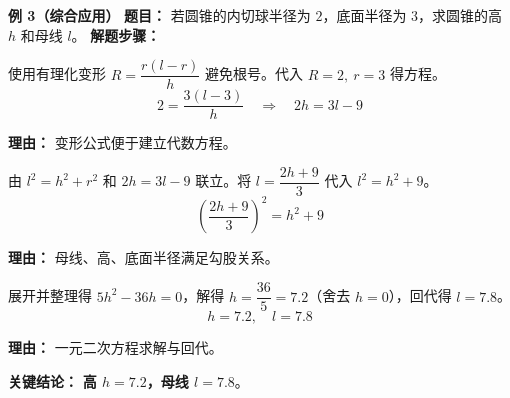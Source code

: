 \begin{examplebox}
	\medskip
	\textbf{\textcolor{CExample}{例 3（综合应用）}}
	\textbf{\textcolor{CExample}{题目：}}
	若圆锥的内切球半径为 $2$，底面半径为 $3$，求圆锥的高 $h$ 和母线 $l$。
	\textbf{\textcolor{CExample}{解题步骤：}}
	\begin{description}[style=nextline, leftmargin=2.8em, labelsep=0.5em, itemsep=0.45em]
		\item[\textbf{第一步（选变形公式）：}]
			使用有理化变形 $R=\dfrac{r(l-r)}{h}$ 避免根号。代入 $R=2,\ r=3$ 得方程。
			\[
				2=\frac{3(l-3)}{h}\quad\Rightarrow\quad 2h=3l-9
			\]
			\par\textbf{理由：} 变形公式便于建立代数方程。
		\item[\textbf{第二步（联立勾股定理）：}]
			由 $l^2=h^2+r^2$ 和 $2h=3l-9$ 联立。将 $l=\dfrac{2h+9}{3}$ 代入 $l^2=h^2+9$。
			\[
				\left(\frac{2h+9}{3}\right)^2 = h^2+9
			\]
			\par\textbf{理由：} 母线、高、底面半径满足勾股关系。
		\item[\textbf{第三步（解方程）：}]
			展开并整理得 $5h^2-36h=0$，解得 $h=\dfrac{36}{5}=7.2$（舍去 $h=0$），回代得 $l=7.8$。
			\[
				h=7.2,\quad l=7.8
			\]
			\par\textbf{理由：} 一元二次方程求解与回代。
	\end{description}
	\textbf{\textcolor{CExample}{关键结论：}}
	\textbf{高 $h=7.2$，母线 $l=7.8$}。
\end{examplebox}
